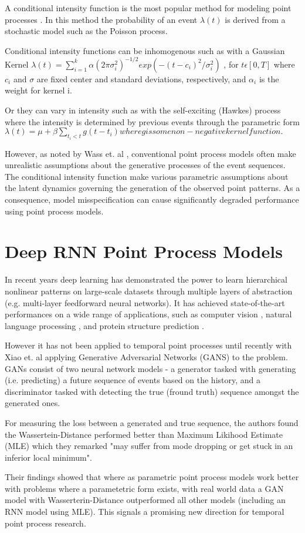 A conditional intensity function is the most popular method for modeling point processes \parencite{DuWang}. In this method the probability of an event $\lambda(t)$ is derived from a stochastic model such as the Poisson process. 

Conditional intensity functions can be inhomogenous such as with a Gaussian Kernel $\lambda(t) = \sum^k_{i=1}\alpha(2\pi \sigma^2_i)^{-1/2}exp(-(t-c_i)^2/\sigma^2_i)$
, for $t \epsilon [0,T]$ where $c_i$ and $\sigma$ are fixed center and standard deviations, respectively, and $\alpha_i$ is the weight for kernel i.

Or they can vary in intensity such as with the self-exciting (Hawkes) process where the intensity is determined by previous events through the parametric form $\lambda(t) = \mu + \beta \sum_{t_i<t}g(t-t_i) where g is some non-negative kernel function.$

However, as noted by Wass et. al \parencite{Wass}, conventional point process models often make unrealistic assumptions about the generative processes of the event sequences. The conditional intensity function make various parametric assumptions about the latent dynamics governing the generation of the observed point patterns. As a consequence, model misspecification can cause significantly degraded
performance using point process models.

\section{Deep RNN Point Process Models}

In recent years deep learning has demonstrated the power to learn hierarchical nonlinear patterns on large-scale datasets \parencite{DL} through multiple layers of abstraction (e.g. multi-layer feedforward neural networks). It has achieved state-of-the-art performances on a wide range of applications, such as computer vision \parencite{ImageNet}, natural language processing \parencite{Socher}, and protein structure prediction \parencite{Lena}.

However it has not been applied to temporal point processes until recently with Xiao et. al \parencite{Wass} applying Generative Adversarial Networks (GANS) to the problem. GANs consist of two neural network models - a generator tasked with generating (i.e. predicting) a future sequence of events based on the history, and a discriminator tasked with detecting the true (fround truth) sequence amongst the generated ones.

For measuring the loss between a generated and true sequence, the authors found the Wassertein-Distance \parencite{WassGAN} performed better than Maximum Likihood Estimate (MLE) which they remarked "may suffer from mode dropping or get stuck in an inferior local minimum".

Their findings showed that where as parametric point process models work better with problems where a parametetric form exists, with real world data a GAN model with Wasserterin-Distance outperformed all other models (including an RNN model using MLE). This signals a promising new direction for temporal point process research.

